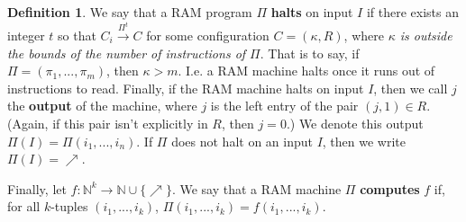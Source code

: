 \documentclass{article}
\theoremstyle{definition}
\newtheorem{definition}{Definition}[section]
\theoremstyle{plain}
\theoremstyle{theorem}
\begin{document}
\begin{definition}
	\par We say that a RAM program $\Pi$ \textbf{halts} on input $I$ if there exists an integer $t$ so that $C_i \overset{\Pi^t}{\to} C$ for some configuration $C = (\kappa,R)$, where \textit{$\kappa$ is outside the bounds of the number of instructions of $\Pi$}. That is to say, if $\Pi = (\pi_1,...,\pi_m)$, then $\kappa > m$. I.e. a RAM machine halts once it runs out of instructions to read. Finally, if the RAM machine halts on input $I$, then we call $j$ the \textbf{output} of the machine, where $j$ is the left entry of the pair $(j,1) \in R$. (Again, if this pair isn't explicitly in $R$, then $j = 0$.) We denote this output $\Pi(I) = \Pi(i_1,...,i_n)$. If $\Pi$ does not halt on an input $I$, then we write $\Pi(I) = \nearrow$. 
	\par Finally, let $f:\mathbb{N}^k \to \mathbb{N} \cup \{\nearrow\}$. We say that a RAM machine $\Pi$ \textbf{computes} $f$ if, for all $k$-tuples $(i_1,...,i_k)$, $\Pi(i_1,...,i_k) = f(i_1,...,i_k)$.
\end{definition}
\fi
\begin{comment}
\par Before continuing, let us formally define from the recursive functions as a 'model of computation'. Since our alphabets are assumed finite, we may always WLOG that the symbols are an initial segment of the natural numbers. Let's say that a function $f:\{0,1,...,n\}^{\#} \to \{0,1,...,n\}^{\#}$ is (recursively) computable if the function $f^*:\mathbb{N} \to \mathbb{N}$ defined by $f^*(n) = \langle f(x) \rangle$ is recursive, where $x$ is the string coded by $n$. What we then showed in theorem 2.3 is precisely that this model is at least as powerful as the Turing machine model. What we need now is the converse - we wish to show that any function from strings to strings which is computable in the recursive model is also recursive in the Turing machine model. However, the recursive model is currently at an advantage, because there is an explicit definition of what it means for a function from $\omega$ to $\omega$ to be computable. Let us define what it means for Turing machines. We say that a function $f:\omega \to \omega$ is Turing computable if there is a machine which computes the function in binary. That is, for any $x \in \mathbb{N}$, $M(x^b) = f(x)_b$, and we will say that the machine $M$ \textbf{implements} $f$. If we can show that all of the recursive functions can be implemented by Turing machines, then it will follow that in particular the coding/decoding functions are implementable, and while the details would be messy, it should be easy to see from that point that the process of decoding the output 'number' $f^*(n)$ and writing out the symbols of the actual function $f$ is extremely doable. Thus if we can show that all recursive functions are implementable by a Turing machine, then it will follow that the two models of computation are equivalent. That is to say, the set of functions which are computable in both models are in fact the same.
\end{comment}
\end{document}
